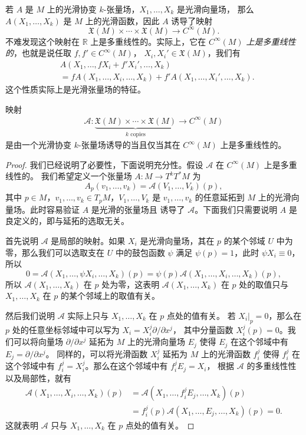 若 $A$ 是 $M$ 上的光滑协变 $k$-张量场，$X_1,\dots,X_k$ 是光滑向量场，
那么 $A(X_1,\dots,X_k)$ 是 $M$ 上的光滑函数，因此 $A$ 诱导了映射
\[
  \mathfrak{X}(M)\times\cdots\times \mathfrak{X}(M)\to C^\infty(M).  
\]
不难发现这个映射在 $\mathbb{R}$ 上是多重线性的。实际上，它在 
\emph{$C^\infty(M)$ 上是多重线性的}，也就是说任取 $f,f'\in C^\infty(M)$，
$X_i,X_i'\in \mathfrak{X}(M)$，我们有
\begin{align*}
  &A(X_1,\dots,fX_i+f'X_i',\dots,X_k)\\
  &=fA(X_1,\dots,X_i,\dots,X_k)+f'A(X_1,\dots,X_i',\dots,X_k).
\end{align*}
这个性质实际上是光滑张量场的特征。

\begin{lemma}[张量表征引理]
  映射
  \begin{align*}
    \mathcal{A}:\underbrace{\mathfrak{X}(M)\times\cdots\times \mathfrak{X}(M)}
    _{\text{$k$ copies}}\to C^\infty(M)
  \end{align*}
  是由一个光滑协变 $k$-张量场诱导的当且仅当其在 $C^\infty(M)$ 上是多重线性的。
\end{lemma}
\begin{proof}
  我们已经说明了必要性，下面说明充分性。假设 $\mathcal{A}$ 在 $C^\infty(M)$ 上是多重线性的。
  我们希望定义一个张量场 $A:M\to T^kT^*M$ 为
  \[
    A_p(v_1,\dots,v_k)=\mathcal{A}(V_1,\dots,V_k)(p),  
  \]
  其中 $p\in M$，$v_1,\dots,v_k\in T_pM$，$V_1,\dots,V_k$ 是 $v_1,\dots,v_k$
  的任意延拓到 $M$ 上的光滑向量场。此时容易验证 $A$ 是光滑的张量场且
  诱导了 $\mathcal{A}$。下面我们只需要说明 $A$ 是良定义的，即与延拓的选取无关。

  首先说明 $\mathcal{A}$ 是局部的映射。如果 $X_i$ 是光滑向量场，其在 $p$
  的某个邻域 $U$ 中为零，那么我们可以选取支在 $U$ 中的鼓包函数 $\psi$
  满足 $\psi(p)=1$，此时 $\psi X_i\equiv 0$，所以
  \[
    0=\mathcal{A}(X_1,\dots,\psi X_i,\dots,X_k)(p)= 
  \psi(p)\mathcal{A}(X_1,\dots,X_i,\dots,X_k)(p),
  \]
  所以 $\mathcal{A}(X_1,\dots,X_k)$ 在 $p$ 处为零，这表明 $\mathcal{A}(X_1,\dots,X_k)$
  在 $p$ 处的取值只与 $X_1,\dots,X_k$ 在 $p$ 的某个邻域上的取值有关。

  然后我们说明 $\mathcal{A}$ 实际上只与 $X_1,\dots,X_k$ 在 $p$ 点处的值有关。
  若 $X_i|_p=0$，那么在 $p$ 处的任意坐标邻域中可以写为 $X_i=X_i^j\partial/\partial x^j$，
  其中分量函数 $X_i^j(p)=0$。我们可以将向量场 $\partial/\partial x^j$
  延拓为 $M$ 上的光滑向量场 $E_j$ 使得 $E_j$ 在这个邻域中有 $E_j=\partial/\partial x^j$。
  同样的，可以将光滑函数 $X_i^j$ 延拓为 $M$ 上的光滑函数 $f_i^j$ 使得
  $f_i^j$ 在这个邻域中有 $f_i^j=X_i^j$。那么在这个邻域中有 $f_i^jE_j=X_i$，
  根据 $\mathcal{A}$ 的多重线性性以及局部性，就有
  \begin{align*}
    \mathcal{A}(X_1,\dots,X_i,\dots,X_k)(p)&=
    \mathcal{A}(X_1,\dots,f_i^jE_j,\dots,X_k)(p)\\
    &=f_i^j(p)\mathcal{A}(X_1,\dots,E_j,\dots,X_k)(p)=0.
  \end{align*} 
  这就表明 $\mathcal{A}$ 只与 $X_1,\dots,X_k$ 在 $p$ 点处的值有关。
\end{proof}

